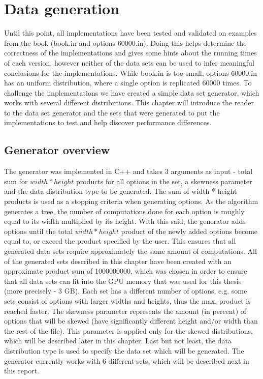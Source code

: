 \chapter{Data generation}
\label{chapter:datageneration}
Until this point, all implementations have been tested and validated on examples from the book (book.in and options-60000.in). Doing this helps determine the correctness of the implementations and gives some hints about the running times of each version, however neither of the data sets can be used to infer meaningful conclusions for the implementations. While book.in is too small, options-60000.in has an uniform distribution, where a single option is replicated 60000 times. To challenge the implementations we have created a simple data set generator, which works with several different distributions. This chapter will introduce the reader to the data set generator and the sets that were generated to put the implementations to test and help discover performance differences.   

\section{Generator overview}
The generator was implemented in C++ and takes 3 arguments as input - total sum for $width*height$ products for all options in the set, a skewness parameter and the data distribution type to be generated. The sum of width * height products is used as a stopping criteria when generating options. As the algorithm generates a tree, the number of computations done for each option is roughly equal to its width multiplied by its height. With this said, the generator adds options until the total $width*height$ product of the newly added options become equal to, or exceed the product specified by the user. This ensures that all generated data sets require approximately the same amount of computations. All of the generated sets described in this chapter have been created with an approximate product sum of 1000000000, which was chosen in order to ensure that all data sets can fit into the GPU memory that was used for this thesis (more precisely - 3 GB). Each set has a different number of options, e.g. some sets consist of options with larger widths and heights, thus the max. product is reached faster.  The skewness parameter represents the amount (in percent) of options that will be skewed (have significantly different height and/or width than the rest of the file). This parameter is applied only for the skewed distributions, which will be described later in this chapter. Last but not least, the data distribution type is used to specify the data set which will be generated. The generator currently works with 6 different sets, which will be described next in this report. 


